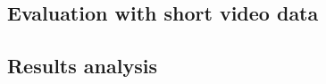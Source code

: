 \subsection{Evaluation with short video data}
\label{subsec:evaluation-short}


\subsection{Results analysis}
\label{sec:results-analysis}

